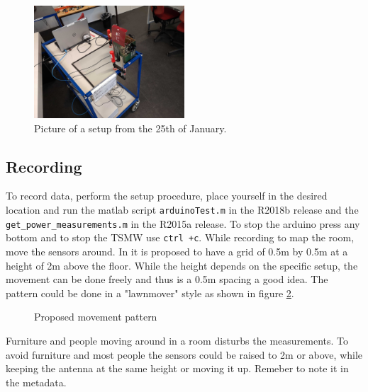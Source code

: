 \documentclass[a4paper,twoside, 12pt]{article}
\begin{document}
\begin{figure}[ht]
\centering
\includegraphics[width=0.5\textwidth]{rullebord2.jpg}
\caption{Picture of a setup from the 25th of January.}
\label{fig:rul2}
\end{figure}

\subsection{Recording}

To record data, perform the setup procedure, place yourself in the desired location and run the matlab script \texttt{arduinoTest.m} in the R2018b release and the \texttt{get\_power\_measurements.m} in the R2015a release. To stop the arduino press any bottom and to stop the TSMW use \texttt{ctrl +c}. While recording to map the room, move the sensors around. In \cite{artikel} it is proposed to have a grid of 0.5m by 0.5m at a height of 2m above the floor. While the height depends on the specific setup, the movement can be done freely and thus is a 0.5m spacing a good idea. The pattern could be done in a "lawnmover" style as shown in figure \ref{fig:lawnmover}.
\begin{figure}[ht]
\centering
{}
\caption{Proposed movement pattern}
\label{fig:lawnmover}
\end{figure}

Furniture and people moving around in a room disturbs the measurements. To avoid furniture and most people the sensors could be raised to 2m or above, while keeping the antenna at the same height or moving it up. Remeber to note it in the metadata.
\end{document}
